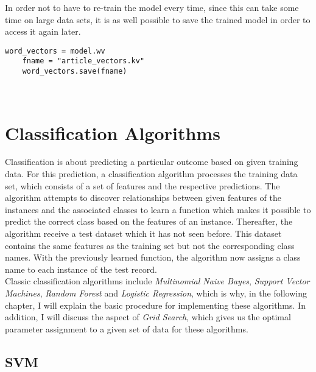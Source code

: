 \documentclass[a4paper, 11pt,titlepage,oneside,openany]{book}
\begin{document}
\noindent In order not to have to re-train the model every time, since this can take some time on large data sets, it is as well possible to save the trained model in order to access it again later.\\
\noindent
\begin{minipage}{\linewidth}
	\begin{lstlisting}[frame=single]
	word_vectors = model.wv
	fname = "article_vectors.kv"
	word_vectors.save(fname)
	\end{lstlisting}
\end{minipage} \\
\section{Classification Algorithms}
Classification is about predicting a particular outcome based on given training data. For this prediction, a classification algorithm processes the training data set, which consists of a set of features and the respective predictions. The algorithm attempts to discover relationships between given features  of the instances and the associated classes to learn a function which makes it possible to predict the correct class based on the features of an instance. Thereafter, the algorithm receive a test dataset which it has not seen before. This dataset contains the same features as the training set but not the corresponding class names. With the previously learned function, the algorithm now assigns a class name to each instance  of the test record. \\
\noindent Classic classification algorithms include \textit{Multinomial Naive Bayes}, \textit{Support Vector Machines}, \textit{Random Forest} and \textit{Logistic Regression}, which is why, in the following chapter, I will explain the basic procedure for implementing these algorithms. In addition, I will discuss the aspect of \textit{Grid Search}, which gives us the optimal parameter assignment to a given set of data for these algorithms.
\subsection{SVM}
\end{document}
